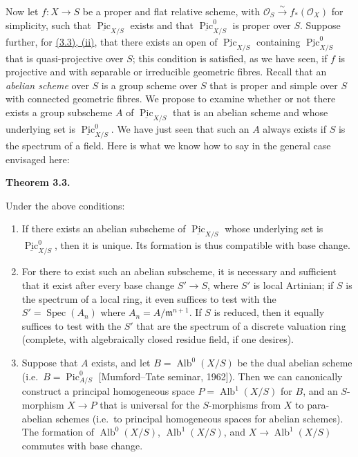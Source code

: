 \documentclass{article}
\providecommand{\tightlist}{%
  \setlength{\itemsep}{0pt}\setlength{\parskip}{0pt}}
\newenvironment{itenv}[1]
  {\phantomsection\par\smallskip\noindent\textbf{#1.}\itshape}
  {\par\smallskip}
\theoremstyle{definition}
\theoremstyle{definition}
\theoremstyle{definition}
\theoremstyle{definition}
\theoremstyle{remark}
\begin{document}
Now let \(f\colon X\to S\) be a proper and flat relative scheme, with \({\mathscr{O}}_S\xrightarrow{\sim}f_*({\mathscr{O}}_X)\) for simplicity, such that \(\underline{\operatorname{Pic}}_{X/S}\) exists and that \(\underline{\operatorname{Pic}}_{X/S}^0\) is proper over \(S\).
Suppose further, for \protect\hyperlink{fga-3-vi-theorem-3.3}{(3.3), (ii)}, that there exists an open of \(\underline{\operatorname{Pic}}_{X/S}\) containing \(\underline{\operatorname{Pic}}_{X/S}^0\) that is quasi-projective over \(S\);
this condition is satisfied, as we have seen, if \(f\) is projective and with separable or irreducible geometric fibres.
Recall that an \emph{abelian scheme} over \(S\) is a group scheme over \(S\) that is proper and simple over \(S\) with connected geometric fibres.
We propose to examine whether or not there exists a group subscheme \(A\) of \(\underline{\operatorname{Pic}}_{X/S}\) that is an abelian scheme and whose underlying set is \(\underline{\operatorname{Pic}}_{X/S}^0\).
We have just seen that such an \(A\) always exists if \(S\) is the spectrum of a field.
Here is what we know how to say in the general case envisaged here:

\hypertarget{fga-3-vi-theorem-3.3}{}
\begin{itenv}{Theorem 3.3}

Under the above conditions:

\begin{enumerate}
\def\labelenumi{\roman{enumi}.}
\tightlist
\item
  If there exists an abelian subscheme of \(\underline{\operatorname{Pic}}_{X/S}\) whose underlying set is \(\underline{\operatorname{Pic}}_{X/S}^0\), then it is unique.
  Its formation is thus compatible with base change.
\item
  For there to exist such an abelian subscheme, it is necessary and sufficient that it exist after every base change \(S'\to S\), where \(S'\) is local Artinian;
  if \(S\) is the spectrum of a local ring, it even suffices to test with the \(S'=\operatorname{Spec}(A_n)\) where \(A_n=A/{\mathfrak{m}}^{n+1}\).
  If \(S\) is reduced, then it equally suffices to test with the \(S'\) that are the spectrum of a discrete valuation ring (complete, with algebraically closed residue field, if one desires).
\item
  Suppose that \(A\) exists, and let \(B=\operatorname{Alb}^0(X/S)\) be the dual abelian scheme (i.e.~\(B=\operatorname{Pic}_{A/S}^0\) {[}Mumford--Tate seminar, 1962{]}).
  Then we can canonically construct a principal homogeneous space \(P=\operatorname{Alb}^1(X/S)\) for \(B\), and an \(S\)-morphism \(X\to P\) that is universal for the \(S\)-morphisms from \(X\) to para-abelian schemes (i.e.~to principal homogeneous spaces for abelian schemes).
  The formation of \(\operatorname{Alb}^0(X/S)\), \(\operatorname{Alb}^1(X/S)\), and \(X\to\operatorname{Alb}^1(X/S)\) commutes with base change.
\end{enumerate}

\end{itenv}
\end{document}
